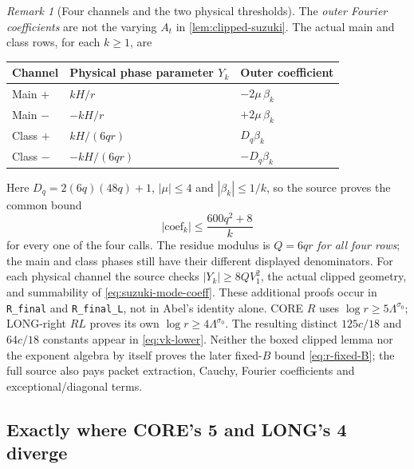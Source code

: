 \documentclass[11pt]{article}
\newcommand{\Lam}{\Lambda}
\theoremstyle{definition}
\theoremstyle{remark}
\newtheorem{remark}[theorem]{Remark}
\newcommand{\1}{\mathbf 1}
\begin{document}
\begin{remark}[Four channels and the two physical thresholds]
\label{rem:suzuki-four-channels}
The \emph{outer Fourier coefficients} are not the varying
$A_t$ in \cref{lem:clipped-suzuki}. The actual main and class
rows, for each $k\ge1$, are
\begin{center}
\small
\begin{tabular}{@{}lll@{}}
\toprule
Channel & Physical phase parameter $Y_k$ & Outer coefficient\\
\midrule
Main $+$ & $kH/r$ & $-2\mu\,\beta_k$\\
Main $-$ & $-kH/r$ & $+2\mu\,\beta_k$\\
Class $+$ & $kH/(6qr)$ & $D_q\beta_k$\\
Class $-$ & $-kH/(6qr)$ & $-D_q\beta_k$\\
\bottomrule
\end{tabular}
\end{center}
Here $D_q=2(6q)(48q)+1$, $|\mu|\le4$ and
$|\beta_k|\le1/k$, so the source proves the common bound
\begin{equation}\label{eq:suzuki-mode-coeff}
 |\mathrm{coef}_k|\le\frac{600q^2+8}{k}
\end{equation}
for every one of the four calls. The residue modulus is
$Q=6qr$ \emph{for all four rows}; the main and class phases
still have their different displayed denominators.
For each physical channel the source checks
$|Y_k|\ge8QV_1^2$, the actual clipped geometry, and
summability of \eqref{eq:suzuki-mode-coeff}. These
additional proofs occur in \texttt{R\_final} and
\texttt{R\_final\_L}, not in Abel's identity alone.
CORE $R$ uses $\log r\ge5\Lam^{\sigma_0}$;
LONG-right $RL$ proves its own $\log r\ge4\Lam^{\sigma_0}$.
The resulting distinct $125c/18$ and $64c/18$ constants
appear in \eqref{eq:vk-lower}. Neither the boxed clipped
lemma nor the exponent algebra by itself proves the later
fixed-$B$ bound \eqref{eq:r-fixed-B}; the full source also
pays packet extraction, Cauchy, Fourier coefficients and
exceptional/diagonal terms.
\end{remark}

\subsection{Exactly where CORE's 5 and LONG's 4 diverge}
\end{document}

